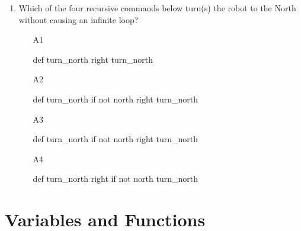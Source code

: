 \begin{enumerate}
\begin{enumerate}
\end{enumerate}
\item Which of the four recursive commands below 
turn(s) the robot to the North without causing an infinite loop?
\begin{enumerate}
\item[A1]
\begin{bluecode}
def turn_north
    right
    turn_north
\end{bluecode}
\item[A2] 
\begin{bluecode}
def turn_north
    if not north
        right
    turn_north
\end{bluecode}
\item[A3] 
\begin{bluecode}
def turn_north
    if not north
        right
        turn_north
\end{bluecode}
\item[A4] 
\begin{bluecode}
def turn_north
    right
    if not north 
        turn_north
\end{bluecode}
\end{enumerate}
\end{enumerate}


\section{Variables and Functions}

